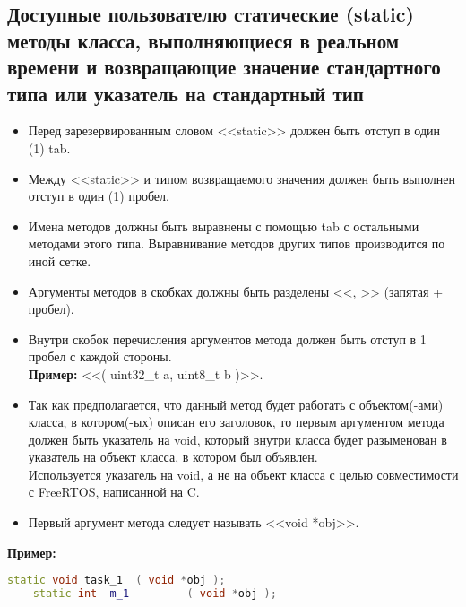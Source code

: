 \subsection{Доступные пользователю статические (static) методы класса, выполняющиеся в реальном времени и возвращающие значение стандартного типа или указатель на стандартный тип}\label{dp:s:s}	\begin{itemize}
	\item Перед зарезервированным словом <<static>> должен быть отступ в один (1) tab.
	\item Между <<static>> и типом возвращаемого значения должен быть выполнен отступ в один (1) пробел.
	\item Имена методов должны быть выравнены с помощью tab с остальными методами этого типа. Выравнивание методов других типов производится по иной сетке.
	\item Аргументы методов в скобках должны быть разделены <<, >> (запятая + пробел).
	\item Внутри скобок перечисления аргументов метода должен быть отступ в 1 пробел с каждой стороны.\\\textbf{Пример: } <<( uint32\_t a, uint8\_t b )>>.
	\item Так как предполагается, что данный метод будет работать с объектом(-ами) класса, в котором(-ых) описан его заголовок, то первым аргументом метода должен быть указатель на void, который внутри класса будет разыменован в указатель на объект класса, в котором был объявлен.\\Используется указатель на void, а не на объект класса с целью совместимости с FreeRTOS, написанной на C.
	\item Первый аргумент метода следует называть <<void *obj>>.
\end{itemize}
\textbf{Пример:}\begin{lstlisting}[language=C++, frame=tlBR, basicstyle=\fontsize{10}{10}\ttfamily]
	static void	task_1	( void *obj );
	static int	m_1			( void *obj );
\end{lstlisting}


